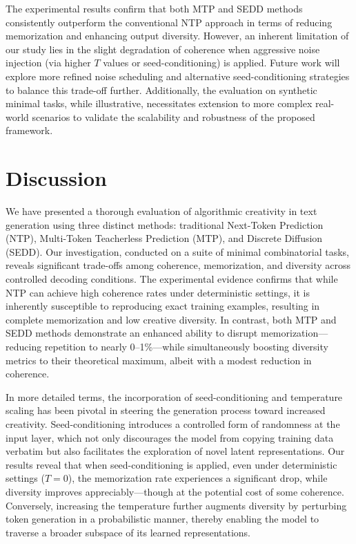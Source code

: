 \documentclass{article} %
\begin{document}
The experimental results confirm that both MTP and SEDD methods consistently outperform the conventional NTP approach in terms of reducing memorization and enhancing output diversity. However, an inherent limitation of our study lies in the slight degradation of coherence when aggressive noise injection (via higher \(T\) values or seed-conditioning) is applied. Future work will explore more refined noise scheduling and alternative seed-conditioning strategies to balance this trade-off further. Additionally, the evaluation on synthetic minimal tasks, while illustrative, necessitates extension to more complex real-world scenarios to validate the scalability and robustness of the proposed framework.

\section{Discussion}
We have presented a thorough evaluation of algorithmic creativity in text generation using three distinct methods: traditional Next-Token Prediction (NTP), Multi-Token Teacherless Prediction (MTP), and Discrete Diffusion (SEDD). Our investigation, conducted on a suite of minimal combinatorial tasks, reveals significant trade-offs among coherence, memorization, and diversity across controlled decoding conditions. The experimental evidence confirms that while NTP can achieve high coherence rates under deterministic settings, it is inherently susceptible to reproducing exact training examples, resulting in complete memorization and low creative diversity. In contrast, both MTP and SEDD methods demonstrate an enhanced ability to disrupt memorization—reducing repetition to nearly 0–1\%—while simultaneously boosting diversity metrics to their theoretical maximum, albeit with a modest reduction in coherence.

In more detailed terms, the incorporation of seed-conditioning and temperature scaling has been pivotal in steering the generation process toward increased creativity. Seed-conditioning introduces a controlled form of randomness at the input layer, which not only discourages the model from copying training data verbatim but also facilitates the exploration of novel latent representations. Our results reveal that when seed-conditioning is applied, even under deterministic settings (\(T=0\)), the memorization rate experiences a significant drop, while diversity improves appreciably—though at the potential cost of some coherence. Conversely, increasing the temperature further augments diversity by perturbing token generation in a probabilistic manner, thereby enabling the model to traverse a broader subspace of its learned representations.
\end{document}
